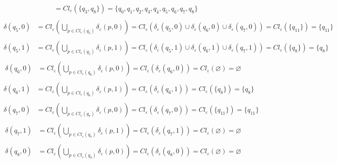 {\begin{align*}
        &= Cl_\varepsilon(\{q_3,q_8\}) = \{q_0,q_1,q_2,q_3,q_4,q_5,q_6,q_7,q_8\}\\
    \end{align*}
    \begin{align*}
      \delta(q_5, 0) &= Cl_{\varepsilon}(\bigcup_{p \in Cl_{\varepsilon}(q_5)} \delta_{\varepsilon}(p,0)) = Cl_\varepsilon(\delta_\varepsilon(q_5,0) \cup \delta_\varepsilon(q_6,0) \cup \delta_\varepsilon(q_7, 0)) = Cl_\varepsilon(\{q_{11}\}) = \{q_{11}\}\\
    \end{align*}
    \begin{align*}
      \delta(q_5, 1) &= Cl_{\varepsilon}(\bigcup_{p \in Cl_{\varepsilon}(q_5)} \delta_{\varepsilon}(p,1)) = Cl_\varepsilon(\delta_\varepsilon(q_5,1) \cup \delta_\varepsilon(q_6,1) \cup \delta_\varepsilon(q_7,1)) = Cl_\varepsilon(\{q_8\}) = \{q_8\}\\
    \end{align*}
    \begin{align*}
      \delta(q_6, 0) &= Cl_{\varepsilon}(\bigcup_{p \in Cl_{\varepsilon}(q_6)} \delta_{\varepsilon}(p,0)) = Cl_\varepsilon(\delta_\varepsilon(q_6,0)) = Cl_\varepsilon(\varnothing) = \varnothing\\ 
    \end{align*}
    \begin{align*}
      \delta(q_6, 1) &= Cl_{\varepsilon}(\bigcup_{p \in Cl_{\varepsilon}(q_6)} \delta_{\varepsilon}(p,1)) = Cl_\varepsilon(\delta_\varepsilon(q_6,1)) = Cl_\varepsilon(\{q_8\}) = \{q_8\}\\
    \end{align*}
    \begin{align*}
      \delta(q_7, 0) &= Cl_{\varepsilon}(\bigcup_{p \in Cl_{\varepsilon}(q_7)} \delta_{\varepsilon}(p,0)) = Cl_\varepsilon(\delta_\varepsilon(q_7,0)) = Cl_\varepsilon(\{q_{11}\}) = \{q_{11}\}\\
    \end{align*}
    \begin{align*}
      \delta(q_7, 1) &= Cl_{\varepsilon}(\bigcup_{p \in Cl_{\varepsilon}(q_7)} \delta_{\varepsilon}(p,1)) = Cl_\varepsilon(\delta_\varepsilon(q_7,1)) = Cl_\varepsilon(\varnothing) = \varnothing\\
    \end{align*}
    \begin{align*}
      \delta(q_8, 0) &= Cl_{\varepsilon}(\bigcup_{p \in Cl_{\varepsilon}(q_8)} \delta_{\varepsilon}(p,0)) = Cl_\varepsilon(\delta_\varepsilon(q_8,0)) = Cl_\varepsilon(\varnothing) = \varnothing\\

\end{align*}}
